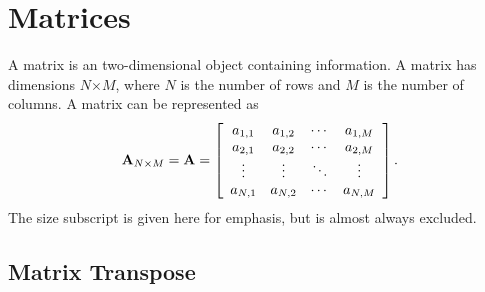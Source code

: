 \section{Matrices}

A matrix is an two-dimensional object containing information. A matrix has dimensions $N$$\times$$M$, where $N$ is the number of rows and $M$ is the number of columns. A matrix can be represented as
\begin{align}
  \mathbf{A}_{N \times M} = \mathbf{A} =
  \left[ \begin{array}{c c c c} a_{1,1} & a_{1,2} & \cdots & a_{1,M} \\
  								a_{2,1} & a_{2,2} & \cdots & a_{2,M} \\
								\vdots  & \vdots  & \ddots & \vdots  \\
								a_{N,1} & a_{N,2} & \cdots & a_{N,M} \\ \end{array} \right].
\end{align}
The size subscript is given here for emphasis, but is almost always excluded.


\subsection{Matrix Transpose}


